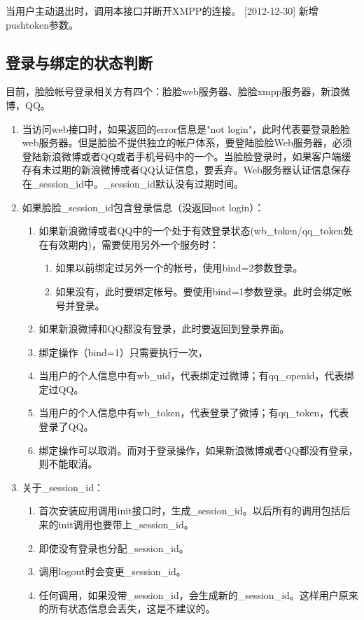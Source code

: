 当用户主动退出时，调用本接口并断开XMPP的连接。
[2012-12-30] 新增pushtoken参数。



\subsection{登录与绑定的状态判断}
目前，脸脸帐号登录相关方有四个：脸脸web服务器、脸脸xmpp服务器，新浪微博，QQ。

\begin{enumerate}

\item 当访问web接口时，如果返回的error信息是"not login"，此时代表要登录脸脸web服务器。但是脸脸不提供独立的帐户体系，要登陆脸脸Web服务器，必须登陆新浪微博或者QQ或者手机号码中的一个。当脸脸登录时，如果客户端缓存有未过期的新浪微博或者QQ认证信息，要丢弃。Web服务器认证信息保存在\_session\_id中。\_session\_id默认没有过期时间。
\item 如果脸脸\_session\_id包含登录信息（没返回not login）：
\begin{enumerate}

\item 如果新浪微博或者QQ中的一个处于有效登录状态(wb\_token/qq\_token处在有效期内)，需要使用另外一个服务时：
\begin{enumerate}
\item 如果以前绑定过另外一个的帐号，使用bind=2参数登录。
\item 如果没有，此时要绑定帐号。要使用bind=1参数登录。此时会绑定帐号并登录。
\end{enumerate}

\item 如果新浪微博和QQ都没有登录，此时要返回到登录界面。
\item 绑定操作（bind=1）只需要执行一次，
\item 当用户的个人信息中有wb\_uid，代表绑定过微博；有qq\_openid，代表绑定过QQ。
\item 当用户的个人信息中有wb\_token，代表登录了微博；有qq\_token，代表登录了QQ。
\item 绑定操作可以取消。而对于登录操作，如果新浪微博或者QQ都没有登录，则不能取消。
\end{enumerate}

\item 关于\_session\_id：
\begin{enumerate}
\item 首次安装应用调用init接口时，生成\_session\_id。以后所有的调用包括后来的init调用也要带上\_session\_id。
\item 即使没有登录也分配\_session\_id。
\item 调用logout时会变更\_session\_id。
\item 任何调用，如果没带\_session\_id，会生成新的\_session\_id。这样用户原来的所有状态信息会丢失，这是不建议的。


\end{enumerate}
\end{enumerate}
